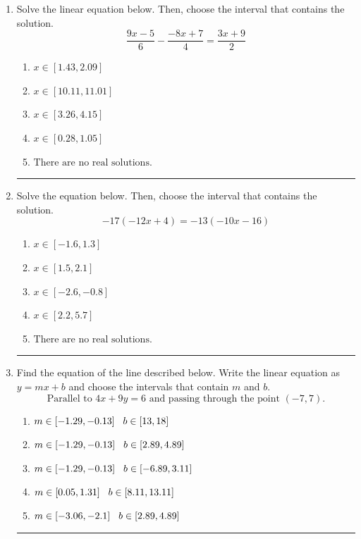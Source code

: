 \documentclass[14pt]{extbook}
\newcommand{\litem}[1]{\item#1\hspace*{-1cm}\rule{\textwidth}{0.4pt}}
\begin{document}
\begin{enumerate}
{\begin{enumerate}[label=\Alph*.]
\end{enumerate} }
\litem{
Solve the linear equation below. Then, choose the interval that contains the solution.\[ \frac{9x -5}{6} - \frac{-8x + 7}{4} = \frac{3x + 9}{2} \]\begin{enumerate}[label=\Alph*.]
\item \( x \in [1.43, 2.09] \)
\item \( x \in [10.11, 11.01] \)
\item \( x \in [3.26, 4.15] \)
\item \( x \in [0.28, 1.05] \)
\item \( \text{There are no real solutions.} \)

\end{enumerate} }
\litem{
Solve the equation below. Then, choose the interval that contains the solution.\[ -17(-12x + 4) = -13(-10x -16) \]\begin{enumerate}[label=\Alph*.]
\item \( x \in [-1.6, 1.3] \)
\item \( x \in [1.5, 2.1] \)
\item \( x \in [-2.6, -0.8] \)
\item \( x \in [2.2, 5.7] \)
\item \( \text{There are no real solutions.} \)

\end{enumerate} }
\litem{
Find the equation of the line described below. Write the linear equation as $ y=mx+b $ and choose the intervals that contain $m$ and $b$.\[ \text{Parallel to } 4 x + 9 y = 6 \text{ and passing through the point } (-7, 7). \]\begin{enumerate}[label=\Alph*.]
\item \( m \in [-1.29, -0.13] \hspace*{3mm} b \in [13, 18] \)
\item \( m \in [-1.29, -0.13] \hspace*{3mm} b \in [2.89, 4.89] \)
\item \( m \in [-1.29, -0.13] \hspace*{3mm} b \in [-6.89, 3.11] \)
\item \( m \in [0.05, 1.31] \hspace*{3mm} b \in [8.11, 13.11] \)
\item \( m \in [-3.06, -2.1] \hspace*{3mm} b \in [2.89, 4.89] \)


\end{enumerate}}
\end{enumerate}
\end{document}
